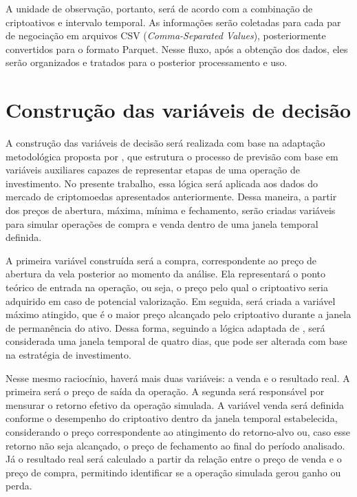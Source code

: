 A unidade de observação, portanto, será de acordo com a combinação de criptoativos e intervalo temporal. As informações serão coletadas para cada par de negociação em arquivos CSV (\textit{Comma-Separated Values}), posteriormente convertidos para o formato Parquet. Nesse fluxo, após a obtenção dos dados, eles serão organizados e tratados para o posterior processamento e uso.

\section{Construção das variáveis de decisão}
\label{sec_construcao_das_variaveis}

A construção das variáveis de decisão será realizada com base na adaptação metodológica proposta por , que estrutura o processo de previsão com base em variáveis auxiliares capazes de representar etapas de uma operação de investimento. No presente trabalho, essa lógica será aplicada aos dados do mercado de criptomoedas apresentados anteriormente. Dessa maneira, a partir dos preços de abertura, máxima, mínima e fechamento, serão criadas variáveis para simular operações de compra e venda dentro de uma janela temporal definida.

A primeira variável construída será a compra, correspondente ao preço de abertura da vela posterior ao momento da análise. Ela representará o ponto teórico de entrada na operação, ou seja, o preço pelo qual o criptoativo seria adquirido em caso de potencial valorização. Em seguida, será criada a variável máximo atingido, que é o maior preço alcançado pelo criptoativo durante a janela de permanência do ativo. Dessa forma, seguindo a lógica adaptada de , será considerada uma janela temporal de quatro dias, que pode ser alterada com base na estratégia de investimento.

Nesse mesmo raciocínio, haverá mais duas variáveis: a venda e o resultado real. A primeira será o preço de saída da operação. A segunda será responsável por mensurar o retorno efetivo da operação simulada. A variável venda será definida conforme o desempenho do criptoativo dentro da janela temporal estabelecida, considerando o preço correspondente ao atingimento do retorno-alvo ou, caso esse retorno não seja alcançado, o preço de fechamento ao final do período analisado. Já o resultado real será calculado a partir da relação entre o preço de venda e o preço de compra, permitindo identificar se a operação simulada gerou ganho ou perda.

